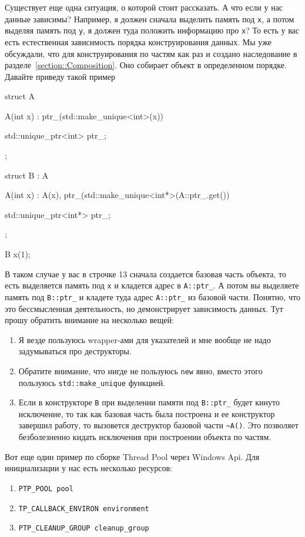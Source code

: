 Существует еще одна ситуация, о которой стоит рассказать.
А что если у нас данные зависимы?
Например, я должен сначала выделить память под \verb"x", а потом выделяя память под \verb"y", я должен туда положить информацию про \verb"x"?
То есть у вас есть естественная зависимость порядка конструирования данных.
Мы уже обсуждали, что для конструирования по частям как раз и создано наследование в разделе~\ref{section::Composition}.
Оно собирает объект в определенном порядке.
Давайте приведу такой пример
\begin{cppcode}
struct A {
  A(int x) : ptr_(std::make_unique<int>(x)) {}
  
  std::unique_ptr<int> ptr_;
};

struct B : A {
  A(int x) : A(x), ptr_(std::make_unique<int*>(A::ptr_.get()) {}
     
   std::unique_ptr<int*> ptr_;
};

B x(1);
\end{cppcode}
В таком случае у вас в строчке 13 сначала создается базовая часть объекта, то есть выделяется память под \verb"x" и кладется адрес в \verb"A::ptr_".
А потом вы выделяете память под \verb"B::ptr_" и кладете туда адрес \verb"A::ptr_" из базовой части.
Понятно, что это бессмысленная деятельность, но демонстрирует зависимость данных.
Тут прошу обратить внимание на несколько вещей:
\begin{enumerate}
\item Я везде пользуюсь wrapper-ами для указателей и мне вообще не надо задумываться про деструкторы.

\item Обратите внимание, что нигде не пользуюсь \verb"new" явно, вместо этого пользуюсь \verb"std::make_unique" функцией.

\item Если в конструкторе \verb"B" при выделении памяти под \verb"B::ptr_" будет кинуто исключение, то так как базовая часть была построена и ее конструктор завершил работу, то вызовется деструктор базовой части \verb"~A()".
Это позволяет безболезненно кидать исключения при построении объекта по частям.
\end{enumerate}
Вот еще один пример по сборке Thread Pool через Windows Api.
Для инициализации у нас есть несколько ресурсов:
\begin{enumerate}
\item \verb"PTP_POOL pool"

\item \verb"TP_CALLBACK_ENVIRON environment"

\item \verb"PTP_CLEANUP_GROUP cleanup_group"
\end{enumerate}
